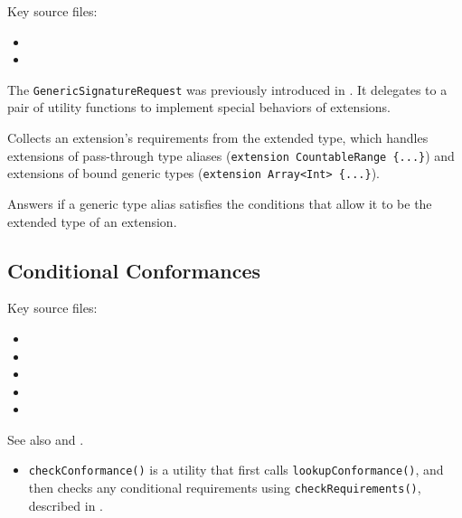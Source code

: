 \documentclass[../generics]{subfiles}
\begin{document}
Key source files:
\begin{itemize}
\item {}
\item {}
\end{itemize}
The \texttt{GenericSignatureRequest} was previously introduced in . It delegates to a pair of utility functions to implement special behaviors of extensions.

Collects an extension's requirements from the extended type, which handles extensions of pass-through type aliases (\verb|extension CountableRange {...}|) and extensions of bound generic types (\verb|extension Array<Int> {...}|).

Answers if a generic type alias satisfies the conditions that allow it to be the extended type of an extension.

\subsection*{Conditional Conformances}

Key source files:
\begin{itemize}
\item {}
\item {}
\item {}
\item {}
\item {}
\end{itemize}


See also  and .
\begin{itemize}
\item \texttt{checkConformance()} is a utility that first calls \texttt{lookupConformance()}, and then checks any conditional requirements using \texttt{checkRequirements()}, described in .
\end{itemize}
\end{document}
